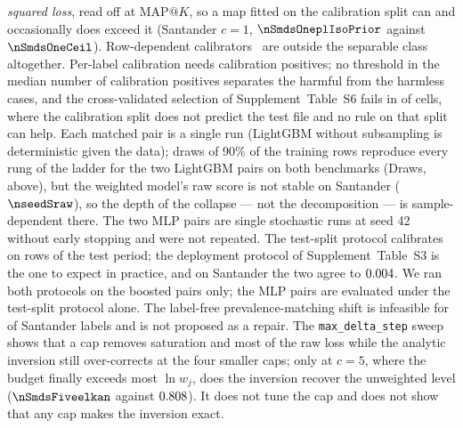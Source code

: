 \documentclass[sigconf,nonacm]{acmart}
\makeatletter
\newcommand{\mapk}{\mathrm{MAP}@K\xspace}
\newcommand{\Supp}[1]{Supplement~#1}  %
\makeatother
\begin{document}
\emph{squared loss}, read off at $\mapk$, so a map fitted on the calibration split can and occasionally does exceed it (Santander $c{=}1$, $\nSmdsOneplIsoPrior$ against $\nSmdsOneCeil$). Row-dependent calibrators~\cite{Rahimi2020IntraOrder} are outside the separable class altogether. Per-label calibration needs calibration positives; no threshold in the median number of calibration positives separates the harmful from the harmless cases, and the cross-validated selection of \Supp{Table~S6} fails in \nnTauSelBelowRaw{} of \nnTauCells{} cells, where the calibration split does not predict the test file and no rule on that split can help. Each matched pair is a single run (LightGBM without subsampling is deterministic given the data); \nseedN{} draws of 90\% of the training rows reproduce every rung of the ladder for the two LightGBM pairs on both benchmarks (Draws, above), but the weighted model's raw score is not stable on Santander ($\nseedSraw$), so the depth of the collapse --- not the decomposition --- is sample-dependent there. The two MLP pairs are single stochastic runs at seed 42 without early stopping and were not repeated.
The test-split protocol calibrates on rows of the test period; the deployment protocol of \Supp{Table~S3} is the one to expect in practice, and on Santander the two agree to $0.004$. We ran both protocols on the boosted pairs only; the MLP pairs are evaluated under the test-split protocol alone. The label-free prevalence-matching shift is infeasible for \nnCappedShift{} of \nnLabels{} Santander labels and is not proposed as a repair. The \texttt{max\_delta\_step} sweep shows that a cap removes saturation and most of the raw loss while the analytic inversion still over-corrects at the four smaller caps; only at $c{=}5$, where the budget finally exceeds most $\ln w_j$, does the inversion recover the unweighted level ($\nSmdsFiveelkan$ against $0.808$). It does not tune the cap and does not show that any cap makes the inversion exact.
\end{document}
